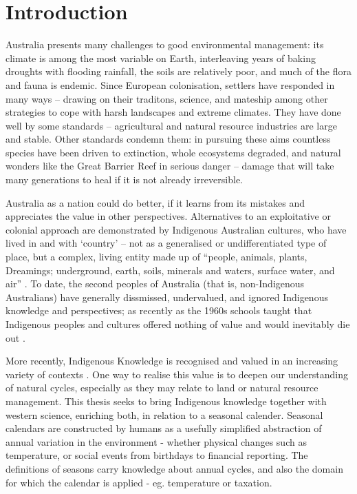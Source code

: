 \chapter{Introduction}
\label{ch:introduction}

Australia presents many challenges to good environmental management: its
climate is among the most variable on Earth, interleaving years of baking
droughts with flooding rainfall, the soils are relatively poor, and much of
the flora and fauna is endemic.
%
Since European colonisation, settlers have responded in many ways --
drawing on their traditons, science, and mateship among other strategies to cope
with harsh landscapes and extreme climates.
%
They have done well by some standards -- agricultural and natural
resource industries are large and stable.  Other standards condemn
them: in pursuing these aims countless species have been driven to extinction,
whole ecosystems degraded, and natural wonders like the Great Barrier Reef
in serious danger -- damage that will take many generations to heal if it is
not already irreversible.

Australia as a nation could do better, if it learns from its mistakes and
appreciates the value in other perspectives.  Alternatives to an exploitative or
colonial approach are demonstrated by Indigenous Australian cultures, who
have lived in and with `country' -- not as a generalised or undifferentiated
type of place, but a complex, living entity made up of ``people, animals,
plants, Dreamings; underground, earth, soils, minerals and waters, surface
water, and air'' \citep{birdrose1996}.
%
To date, the second peoples of Australia (that is, non-Indigenous Australians)
have generally dissmissed, undervalued, and ignored Indigenous knowledge
and perspectives; as recently as the 1960s schools taught that Indigenous
peoples and cultures offered nothing of value and would inevitably die out
\citep{flannery1994}.


More recently, Indigenous Knowledge is recognised and valued in an
increasing variety of contexts \citep[eg.][]{petheram2010,cochran2015,
berkes2012}.  One way to realise this value is to deepen our understanding
of natural cycles, especially as they may relate to land or natural resource
management.  This thesis seeks to bring Indigenous knowledge together with
western science, enriching both, in relation to a seasonal calender.
%
Seasonal calendars are constructed by humans as a usefully simplified
abstraction of annual variation in the environment - whether physical
changes such as temperature, or social events from birthdays to financial
reporting.  The definitions of seasons carry knowledge about annual cycles,
and also the domain for which the calendar is applied - eg. temperature
or taxation.

